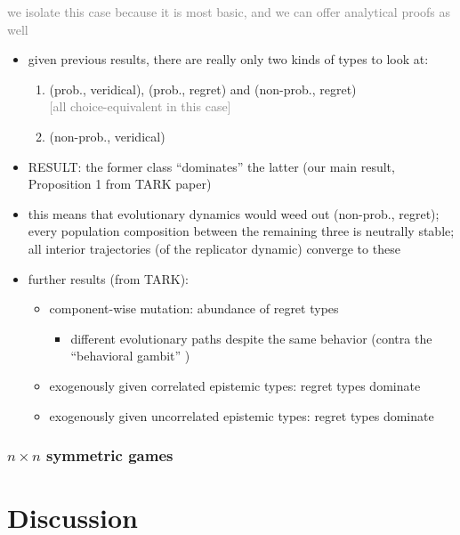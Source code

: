 \documentclass[fleqn,reqno,11pt]{article}
\begin{document}
\textcolor{gray}{we isolate this case because it is most basic, and we can offer analytical
  proofs as well}

\begin{itemize}
\item given previous results, there are really only two kinds of types to look at:
  \begin{enumerate}
  \item (prob., veridical), (prob., regret) and (non-prob., regret) \\ 
    \textcolor{gray}{[all choice-equivalent in this case]}
  \item (non-prob., veridical)
  \end{enumerate}
\item RESULT: the former class ``dominates'' the latter (our main result, Proposition 1 from
  TARK paper)
\item this means that evolutionary dynamics would weed out (non-prob., regret); every
  population composition between the remaining three is neutrally stable; all interior
  trajectories (of the replicator dynamic) converge to these
\item further results (from TARK):
  \begin{itemize}
  \item component-wise mutation: abundance of regret types
    \begin{itemize}
    \item different evolutionary paths despite the same behavior (contra the ``behavioral
      gambit'' \citep{FawcettHamblin2013:Exposing-the-be})
    \end{itemize}
  \item exogenously given correlated epistemic types: regret types dominate
  \item exogenously given uncorrelated epistemic types: regret types dominate
  \end{itemize}
\end{itemize}

\subsubsection{$n \times n$ symmetric games}


\section{Discussion}
\end{document}
